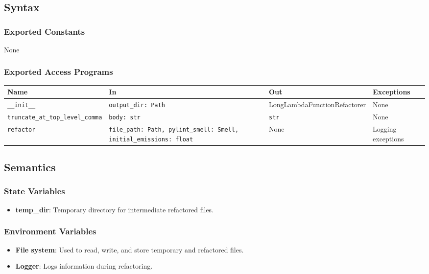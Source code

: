 \documentclass[12pt, titlepage]{article}
\begin{document}
\subsection{Syntax}

\subsubsection{Exported Constants}
None

\subsubsection{Exported Access Programs}

\begin{center}
\begin{tabular}{|p{4cm}|p{5cm}|p{4cm}|p{3cm}|}
\hline
\textbf{Name} & \textbf{In} & \textbf{Out} & \textbf{Exceptions} \\
\hline
\texttt{\_\_init\_\_} & \texttt{output\_dir: Path} & LongLambdaFunctionRefactorer & None \\
\hline
\texttt{truncate\_at\_top\_level\_comma} & \texttt{body: str} & \texttt{str} & None \\
\hline
\texttt{refactor} & \texttt{file\_path: Path, pylint\_smell: Smell, initial\_emissions: float} & None & Logging exceptions \\
\hline
\end{tabular}
\end{center}

\subsection{Semantics}

\subsubsection{State Variables}

\begin{itemize}
  \item \textbf{temp\_dir}: Temporary directory for intermediate refactored files.
\end{itemize}

\subsubsection{Environment Variables}

\begin{itemize}
  \item \textbf{File system}: Used to read, write, and store temporary and refactored files.

  \item \textbf{Logger}: Logs information during refactoring.
\end{itemize}
\end{document}
